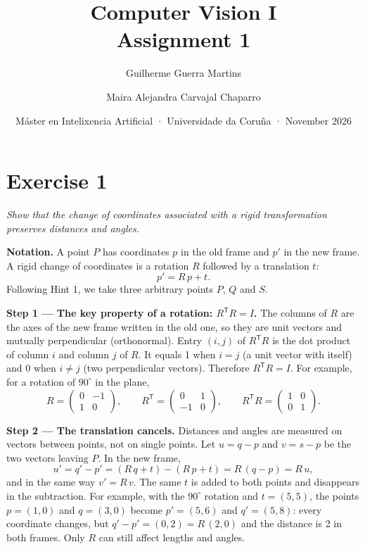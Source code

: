 \documentclass[11pt,a4paper]{article}
\title{Computer Vision I \\ \large Assignment 1}
\author{Guilherme Guerra Martins \and Maira Alejandra Carvajal Chaparro}
\date{Máster en Intelixencia Artificial · Universidade da Coruña · November 2026}
\newcommand{\T}{^{\mathsf{T}}}
\begin{document}
\maketitle

\section*{Exercise 1}
\emph{Show that the change of coordinates associated with a rigid transformation preserves distances and angles.}

\textbf{Notation.} A point $P$ has coordinates $p$ in the old frame and $p'$ in the new frame. A rigid change of coordinates is a rotation $R$ followed by a translation $t$:
\[
p' = R\,p + t .
\]
Following Hint 1, we take three arbitrary points $P$, $Q$ and $S$.

\textbf{Step 1 --- The key property of a rotation: $R\T R = I$.} The columns of $R$ are the axes of the new frame written in the old one, so they are unit vectors and mutually perpendicular (orthonormal). Entry $(i, j)$ of $R\T R$ is the dot product of column $i$ and column $j$ of $R$. It equals 1 when $i = j$ (a unit vector with itself) and 0 when $i \neq j$ (two perpendicular vectors). Therefore $R\T R = I$. For example, for a rotation of $90^\circ$ in the plane,
\[
R = \begin{pmatrix} 0 & -1 \\ 1 & 0 \end{pmatrix}, \qquad
R\T = \begin{pmatrix} 0 & 1 \\ -1 & 0 \end{pmatrix}, \qquad
R\T R = \begin{pmatrix} 1 & 0 \\ 0 & 1 \end{pmatrix}.
\]

\textbf{Step 2 --- The translation cancels.} Distances and angles are measured on vectors between points, not on single points. Let $u = q - p$ and $v = s - p$ be the two vectors leaving $P$. In the new frame,
\[
u' = q' - p' = (R\,q + t) - (R\,p + t) = R\,(q - p) = R\,u ,
\]
and in the same way $v' = R\,v$. The same $t$ is added to both points and disappears in the subtraction. For example, with the $90^\circ$ rotation and $t = (5, 5)$, the points $p = (1, 0)$ and $q = (3, 0)$ become $p' = (5, 6)$ and $q' = (5, 8)$: every coordinate changes, but $q' - p' = (0, 2) = R\,(2, 0)$ and the distance is 2 in both frames. Only $R$ can still affect lengths and angles.
\end{document}
